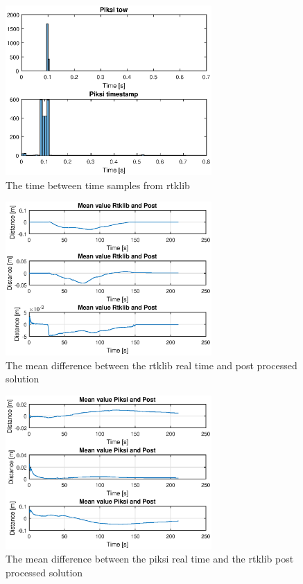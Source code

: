 \begin{figure}[H]
	\centering
		\includegraphics[width=0.7\textwidth]{figs/plots/piksitime.eps}
		\caption{The time between time samples from rtklib}
		\label{figure:RTKLIB_STRUCTURE}
\end{figure}
\begin{figure}[H]
	\centering
		\includegraphics[width=0.7\textwidth]{figs/plots/meanrtkpost.eps}
		\caption{The mean difference between the rtklib real time and post processed solution}
		\label{figure:RTKLIB_STRUCTURE}
\end{figure}
\begin{figure}[H]
	\centering
		\includegraphics[width=0.7\textwidth]{figs/plots/meanpiksipost.eps}
		\caption{The mean difference between the piksi real time and the rtklib post processed solution}
		\label{figure:RTKLIB_STRUCTURE}
\end{figure}
